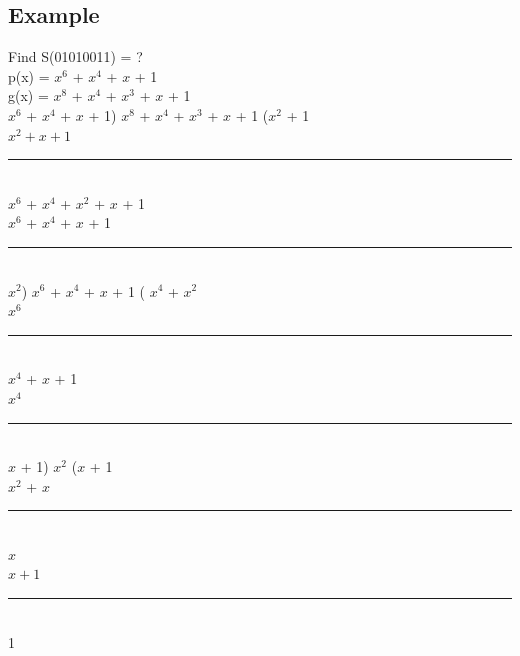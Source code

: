 \documentclass[11pt]{article}
\newcommand*{\xdash}[1][3em]{\rule[0.5ex]{#1}{0.55pt}}
\begin{document}
	\subsection*{Example}
	Find S(01010011) = ?\\
	p(x) = $x^6$ + $x^4$ + $x$ + 1\\
	g(x) = $x^8$ + $x^4$ + $x^3$ + $x$ + 1\vspace{0.2cm}\\
	$x^6$ + $x^4$ + $x$ + 1) $x^8$ + $x^4$ + $x^3$ + $x$ + 1 ($x^2$ + 1\\
	\hspace*{3cm} $x^2 + x + 1$\\
	\hspace*{3cm} \xdash[9.8em]\\
	\hspace*{3cm} $x^6$ + $x^4$ + $x^2$ + $x$ + 1\\
	\hspace*{3cm} $x^6$ + $x^4$ + $x$ + 1\\
	\hspace*{3cm} \xdash[9.8em]\\
	\hspace*{4.6cm} $x^2$) $x^6$ + $x^4$ + $x$ + 1 ( $x^4$ + $x^2$\\
	\hspace*{5.26cm} $x^6$ \\
	\hspace*{5.26cm} \xdash[6em]\\
	\hspace*{5.26cm} $x^4$ + $x$ + 1\\
	\hspace*{5.26cm} $x^4$\\
	\hspace*{5.26cm} \xdash[6em]\\
	\hspace*{6cm} $x$ + 1) $x^2$ ($x$ + 1\\
	\hspace*{7cm} $x^2$ + $x$\\
	\hspace*{7cm} \xdash[3.5em]\\
	\hspace*{7.5cm} $x$\\
	\hspace*{7.5cm} $x + 1$\\
	\hspace*{7.2cm} \xdash[3.5em]\\
	\hspace*{8cm} 1\\
\end{document}
